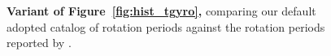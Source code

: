 \documentclass[11pt,twocolumn,tighten,linenumbers,trackchanges]{aastex63}
\begin{document}
\begin{figure}[!th]
  \begin{center}
    \leavevmode

	\vspace{-0.35cm}
  \end{center}
  \vspace{-0.66cm}
  \caption{{\bf Variant of Figure~\ref{fig:hist_tgyro},} comparing
  our default adopted catalog of \citet{Santos_2019,Santos_2021}
  rotation periods against the rotation periods
  reported by \citet{McQuillan_2014}.
  \label{fig:hist_tgyro_mcq}
  }
\end{figure}



\clearpage
\listofchanges
\end{document}
